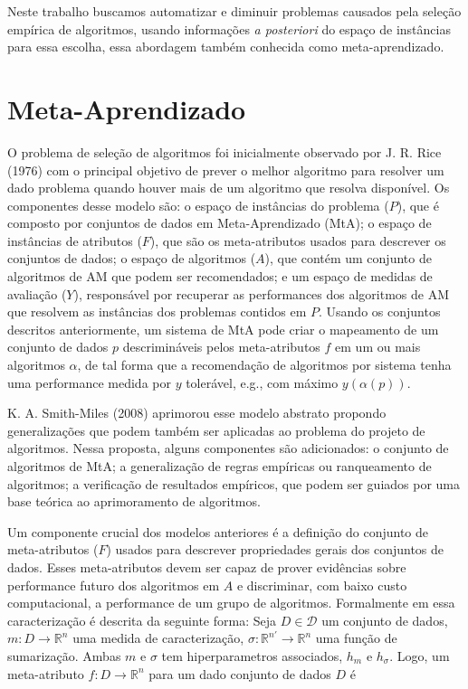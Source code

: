 Neste trabalho buscamos automatizar e diminuir problemas causados pela seleção
empírica de algoritmos, usando informações \textit{a posteriori} do espaço de
instâncias para essa escolha, essa abordagem também conhecida como
meta-aprendizado.

\section{Meta-Aprendizado}
\label{sec:metalearning}

O problema de seleção de algoritmos foi inicialmente observado por J. R. Rice
(1976) \cite{Rice1976} com o principal objetivo de prever o melhor algoritmo
para resolver um dado problema quando houver mais de um algoritmo que resolva
disponível.
Os componentes desse modelo são: o espaço de instâncias do problema ($P$), que
é composto por conjuntos de dados em Meta-Aprendizado (MtA); o espaço de
instâncias de atributos ($F$), que são os meta-atributos usados para descrever
os conjuntos de dados; o espaço de algoritmos ($A$), que contém um conjunto de
algoritmos de AM que podem ser recomendados; e um espaço de medidas de
avaliação ($Y$), responsável por recuperar as performances dos algoritmos de AM
que resolvem as instâncias dos problemas contidos em $P$.
Usando os conjuntos descritos anteriormente, um sistema de MtA pode criar o
mapeamento de um conjunto de dados $p$ descrimináveis pelos meta-atributos $f$
em um ou mais algoritmos $\alpha$, de tal forma que a recomendação de
algoritmos por sistema tenha uma performance medida por $y$ tolerável, e.g.,
com máximo $y(\alpha(p))$.

K. A. Smith-Miles (2008) \cite{SmithMiles2008} aprimorou esse modelo abstrato
propondo generalizações que podem também ser aplicadas ao problema do projeto
de algoritmos.  Nessa proposta, alguns componentes são adicionados: o conjunto
de algoritmos de MtA; a generalização de regras empíricas ou ranqueamento de
algoritmos; a verificação de resultados empíricos, que podem ser guiados por
uma base teórica ao aprimoramento de algoritmos.

Um componente crucial dos modelos anteriores é a definição do conjunto de
meta-atributos ($F$) usados para descrever propriedades gerais dos conjuntos de
dados. Esses meta-atributos devem ser capaz de prover evidências sobre
performance futuro dos algoritmos em $A$ \cite{Soares2001, Reif2012} e
discriminar, com baixo custo computacional, a performance de um grupo de
algoritmos. Formalmente em \cite{Rivolli2018} essa caracterização é descrita da seguinte forma:
Seja $D \in \mathcal{D}$ um conjunto de dados, $m:D\rightarrow\mathbb{R}^n$ uma medida de caracterização, $\sigma:\mathbb{R}^{n'}\rightarrow\mathbb{R}^n$ uma função de sumarização.
Ambas $m$ e $\sigma$ tem hiperparametros associados, $h_m$ e $h_\sigma$. Logo, um meta-atributo
$f:D\rightarrow\mathbb{R}^n$ para um dado conjunto de dados $D$ é

